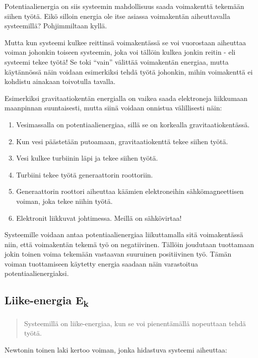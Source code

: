 \documentclass[12pt,a4paper,finnish]{book}
\begin{document}
Potentiaalienergia on siis systeemin mahdollisuus saada voimakenttä tekemään siihen työtä. Eikö silloin 
energia ole itse asiassa voimakentän aiheuttavalla systeemillä? Pohjimmiltaan kyllä.

Mutta kun systeemi kulkee reittinsä voimakentässä se voi vuorostaan aiheuttaa voiman johonkin toiseen 
systeemin, joka voi tällöin kulkea jonkin reitin - eli systeemi tekee työtä! Se toki ``vain'' välittää 
voimakentän energiaa, mutta käytännössä näin voidaan esimerkiksi tehdä työtä johonkin, mihin voimakenttä 
ei kohdistu ainakaan toivotulla tavalla.

Esimerkiksi gravitaatiokentän energialla on vaikea saada elektroneja liikkumaan maanpinnan suuntaisesti, mutta 
siinä voidaan onnistua välillisesti näin:

\begin{enumerate}
 \item Vesimassalla on potentiaalienergiaa, sillä se on korkealla gravitaatiokentässä.
 \item Kun vesi päästetään putoamaan, gravitaatiokenttä tekee siihen työtä.
 \item Vesi kulkee turbiinin läpi ja tekee siihen työtä.
 \item Turbiini tekee työtä generaattorin roottoriin.
 \item Generaattorin roottori aiheuttaa käämien elektroneihin sähkömagneettisen voiman, joka tekee niihin 
 työtä.
 \item Elektronit liikkuvat johtimessa. Meillä on sähkövirtaa!
\end{enumerate}

Systeemille voidaan antaa potentiaalienergiaa liikuttamalla sitä voimakentässä niin, että voimakentän 
tekemä työ on negatiivinen. Tällöin joudutaan tuottamaan jokin toinen voima tekemään vastaavan 
suuruinen positiivinen työ. Tämän voiman tuottamiseen käytetty energia saadaan näin varastoitua 
potentiaalienergiaksi.

\subsection{Liike-energia E\textsubscript{k}}

\begin{quotation}
 Systeemillä on liike-energiaa, kun se voi pienentämällä nopeuttaan tehdä työtä.
\end{quotation}

Newtonin toinen laki kertoo voiman, jonka hidastuva systeemi aiheuttaa:
\end{document}
